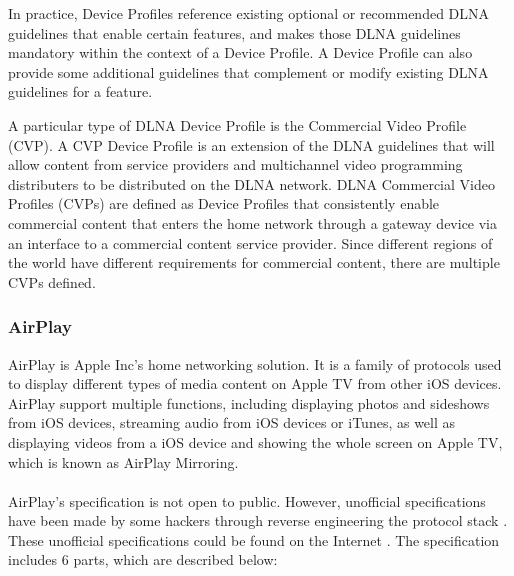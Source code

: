 \begin{enumerate}
In practice, Device Profiles reference existing optional or recommended DLNA guidelines that enable certain features, and makes those DLNA guidelines mandatory within the context of a Device Profile. 
A Device Profile can also provide some additional guidelines that complement or modify existing DLNA guidelines for a feature. 

A particular type of DLNA Device Profile is the Commercial Video Profile (CVP). A CVP Device Profile is an extension of the DLNA guidelines that will allow content from service providers and multichannel video programming distributers to be distributed on the DLNA network. DLNA Commercial Video Profiles (CVPs) are defined as Device Profiles that consistently enable commercial content that enters the home network through a gateway device via an interface to a commercial content service provider. Since different regions of the world have different requirements for commercial content, there are multiple CVPs defined. 

\end{enumerate} 

\subsubsection{AirPlay} 
AirPlay is Apple Inc's home networking solution. It is a family of protocols 
used to display different types of media content on Apple TV from other iOS devices. 
AirPlay support multiple functions, including displaying photos and sideshows from iOS devices, streaming audio from iOS devices or iTunes, as well as displaying videos from a iOS device and 
showing the whole screen on Apple TV, which is known as AirPlay Mirroring. \\
\\
AirPlay's specification is not open to public. However, unofficial specifications have been made by some hackers through reverse engineering the protocol stack \cite{AirPlay-spec}. These unofficial specifications could be found on the Internet \cite{AirPlay-spec}.  
The specification includes 6 parts, which are described below: 

